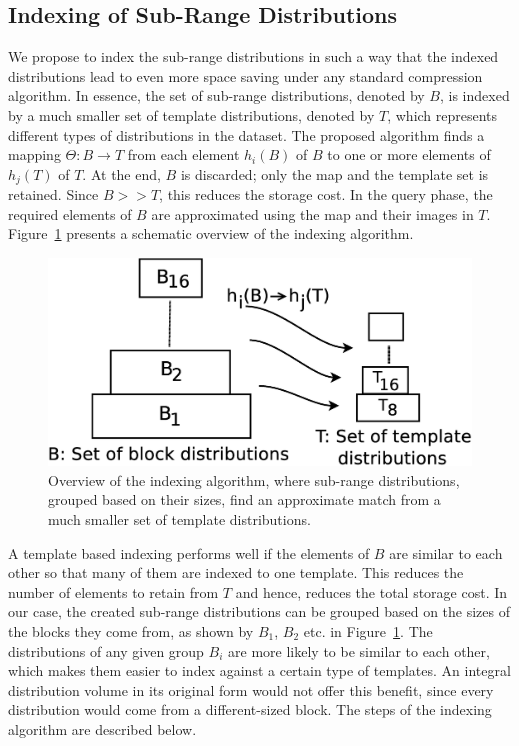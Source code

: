\subsection{Indexing of Sub-Range Distributions}
\label{sec:blockhist_coding}
We propose to index the sub-range distributions in such a way that the indexed distributions lead to even more space saving under any standard compression algorithm. In essence, the set of sub-range distributions, denoted by $B$, is indexed by a much smaller set of template distributions, denoted by $T$, which represents different types of distributions in the dataset. The proposed algorithm finds a mapping $\Theta: B \to T$ from each element $h_i(B)$ of $B$ to one or more elements of $h_j(T)$ of $T$. At the end, $B$ is discarded; only the map and the template set is retained. Since $B>>T$, this reduces the storage cost. In the query phase, the required elements of $B$ are approximated using the map and their images in $T$. Figure~\ref{fig:indexing_overview} presents a schematic overview of the indexing algorithm.
\begin{figure}[tb]
\centering
	\includegraphics[width = 0.55\linewidth, keepaspectratio = true]{images/eps/indexing.eps}
	\caption{Overview of the indexing algorithm, where sub-range distributions, grouped based on their sizes, find an approximate match from a much smaller set of template distributions.}	
	\label{fig:indexing_overview}	
\end{figure}

A template based indexing performs well if the elements of $B$ are similar to each other so that many of them are indexed to one template. This reduces the number of elements to retain from $T$ and hence, reduces the total storage cost. In our case, the created sub-range distributions can be grouped based on the sizes of the blocks they come from, as shown by $B_1$, $B_2$ etc. in Figure~\ref{fig:indexing_overview}. The distributions of any given group $B_i$ are more likely to be similar to each other, which makes them easier to index against a certain type of templates. An integral distribution volume in its original form would not offer this benefit, since every distribution would come from a different-sized block. The steps of the indexing algorithm are described below. 


